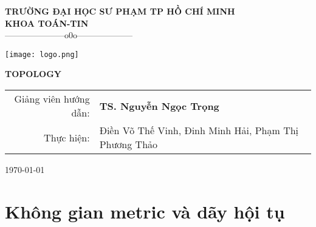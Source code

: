 \documentclass[a4paper, 12pt]{article}
\begin{document}
\begin{titlepage} 
\begin{center}
{\large\bf TRƯỜNG ĐẠI HỌC SƯ PHẠM TP HỒ CHÍ MINH}\\
{\large\bf KHOA TOÁN-TIN} \\
{---------------------o0o--------------------}\\[40pt]
\begin{center}
\texttt{[image: logo.png]}
\end{center}
\vskip 3cm
{\Huge\bf \textbf{TOPOLOGY}}\\
\vskip 2cm
\begin{center}
\begin{tabular}{r l}
Giảng viên hướng dẫn:&{\bf TS. Nguyễn Ngọc Trọng}\\[0.5cm]
Thực hiện: &Điền Võ Thế Vinh, Đinh Minh Hải, Phạm Thị Phương Thảo
\end{tabular}
\end{center}
\vfill
{\today}
\end{center}
\end{titlepage}
\newpage
 \tableofcontents
 \newpage
\section{Không gian metric và dãy hội tụ}%
\end{document}
